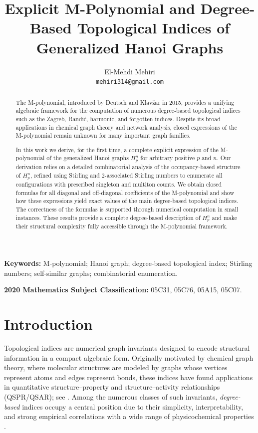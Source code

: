 \documentclass[letterpaper,12pt]{article}
\author[1]{El-Mehdi Mehiri\\
\texttt{mehiri314@gmail.com}}
\title{\textbf{Explicit M-Polynomial and Degree-Based Topological Indices of Generalized Hanoi Graphs}}
\date{}
\begin{document}
\maketitle



\begin{abstract}
\noindent The M-polynomial, introduced by Deutsch and Klavžar in 2015, provides a unifying algebraic framework for the computation of numerous degree-based topological indices such as the Zagreb, Randić, harmonic, and forgotten indices. Despite its broad applications in chemical graph theory and network analysis, closed expressions of the M-polynomial remain unknown for many important graph families. 

\noindent In this work we derive, for the first time, a complete explicit expression of
the M-polynomial of the generalized Hanoi graphs $H_p^n$ for arbitrary positive 
$p$ and $n$.
Our derivation relies on a detailed combinatorial analysis of the 
occupancy-based structure of $H_p^n$, refined using Stirling and 
$2$-associated Stirling numbers to enumerate all configurations with prescribed 
singleton and multiton counts.
We obtain closed formulas for all diagonal and off-diagonal coefficients of the 
M-polynomial and show how these expressions yield exact values of the main 
degree-based topological indices. 
The correctness of the formulas is supported   through  numerical computation in small instances.
These results provide a complete degree-based description of $H_p^n$ and make
their structural complexity fully accessible through the M-polynomial framework.

\end{abstract}

\noindent\textbf{Keywords:} M-polynomial; Hanoi graph; degree-based topological index; Stirling numbers;  self-similar graphs; combinatorial enumeration.


\noindent\textbf{2020 Mathematics Subject Classification:} 05C31, 05C76, 05A15, 05C07.





\section{Introduction}

Topological indices are numerical graph invariants designed to encode structural
information in a compact algebraic form.
Originally motivated by chemical graph theory, where molecular structures are
modeled by graphs whose vertices represent atoms and edges represent bonds,
these indices have found applications in quantitative structure--property and 
structure--activity relationships (QSPR/QSAR); see 
\cite{gutman2012mathematical, Todeschini2010, trinajstic2018chemical}.
Among the numerous classes of such invariants, {\em degree-based} indices occupy
a central position due to their simplicity, interpretability, and strong empirical
correlations with a wide range of physicochemical properties \cite{Dearden2017}.
\end{document}
